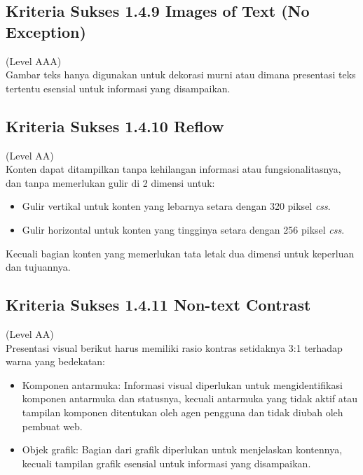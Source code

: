 \subsection{Kriteria Sukses 1.4.9 Images of Text (No Exception)}
\label{subsec:kriteria_1.4.9}
(Level AAA) \\

Gambar teks hanya digunakan untuk dekorasi murni atau dimana presentasi teks tertentu esensial untuk informasi yang disampaikan. 

\subsection{Kriteria Sukses 1.4.10 Reflow}
\label{subsec:kriteria_1.4.10}
(Level AA) \\

Konten dapat ditampilkan tanpa kehilangan informasi atau fungsionalitasnya, dan tanpa memerlukan gulir di 2 dimensi untuk:

\begin{itemize}
	\item Gulir vertikal untuk konten yang lebarnya setara dengan 320 piksel \textit{css}.
	\item Gulir horizontal untuk konten yang tingginya setara dengan 256 piksel \textit{css}.
\end{itemize}

Kecuali bagian konten yang memerlukan tata letak dua dimensi untuk keperluan dan tujuannya.

\subsection{Kriteria Sukses 1.4.11 Non-text Contrast}
\label{subsec:kriteria_1.4.11}
(Level AA) \\

Presentasi visual berikut harus memiliki rasio kontras setidaknya 3:1 terhadap warna yang bedekatan:

\begin{itemize}
	\item Komponen antarmuka: Informasi visual diperlukan untuk mengidentifikasi komponen antarmuka dan statusnya, kecuali antarmuka yang tidak aktif atau tampilan komponen ditentukan oleh agen pengguna dan tidak diubah oleh pembuat web.
	\item Objek grafik: Bagian dari grafik diperlukan untuk menjelaskan kontennya, kecuali tampilan grafik esensial untuk informasi yang disampaikan.
\end{itemize}

